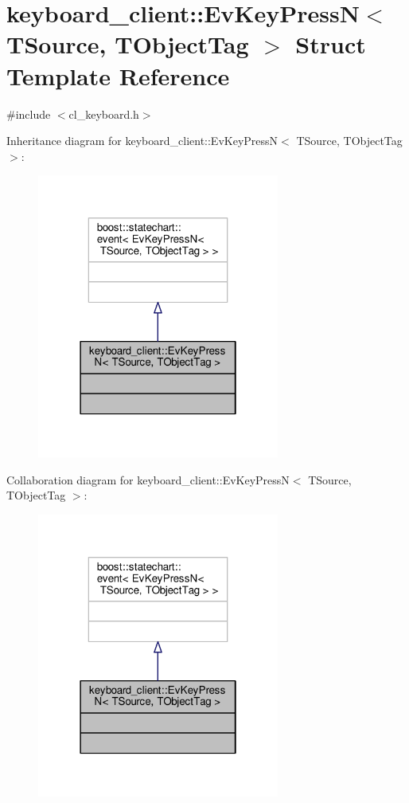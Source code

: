 \hypertarget{structkeyboard__client_1_1EvKeyPressN}{}\section{keyboard\+\_\+client\+:\+:Ev\+Key\+PressN$<$ T\+Source, T\+Object\+Tag $>$ Struct Template Reference}
\label{structkeyboard__client_1_1EvKeyPressN}


{\ttfamily \#include $<$cl\+\_\+keyboard.\+h$>$}



Inheritance diagram for keyboard\+\_\+client\+:\+:Ev\+Key\+PressN$<$ T\+Source, T\+Object\+Tag $>$\+:\nopagebreak
\begin{figure}[H]
\begin{center}
\leavevmode
\includegraphics[width=226pt]{structkeyboard__client_1_1EvKeyPressN__inherit__graph}
\end{center}
\end{figure}


Collaboration diagram for keyboard\+\_\+client\+:\+:Ev\+Key\+PressN$<$ T\+Source, T\+Object\+Tag $>$\+:\nopagebreak
\begin{figure}[H]
\begin{center}
\leavevmode
\includegraphics[width=226pt]{structkeyboard__client_1_1EvKeyPressN__coll__graph}
\end{center}
\end{figure}


